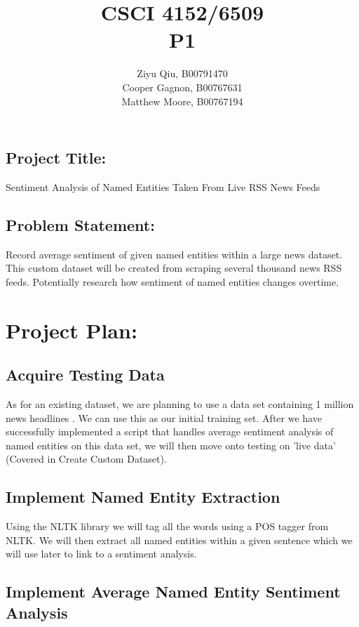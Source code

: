 \documentclass[12pt]{article}
\title{ CSCI 4152/6509  \\ P1 \\}
\author{Ziyu Qiu, B00791470 \\ Cooper Gagnon, B00767631 \\ Matthew Moore, B00767194}
\begin{document}
\maketitle

\begin{center}
\section*{Project Title:}
Sentiment Analysis of Named Entities Taken From Live RSS News Feeds
\end{center}

\begin{center}
\section*{Problem Statement:}
Record average sentiment of given named entities within a large news dataset. This custom dataset will be created from scraping several thousand news RSS feeds. Potentially research how sentiment of named entities changes overtime.
\end{center}

\newpage
\section{Project Plan:}
\subsection{Acquire Testing Data}

As for an existing dataset, we are planning to use a data set containing 1 million news headlines \cite{Kaggle}. We can use this as our initial training set. After we have successfully implemented a script that handles average sentiment analysis of named entities on this data set, we will then move onto testing on 'live data' (Covered in Create Custom Dataset).

\subsection{Implement Named Entity Extraction}

Using the NLTK library we will tag all the words using a POS tagger from NLTK. We will then extract all named entities within a given sentence which we will use later to link to a sentiment analysis.

\subsection{Implement Average Named Entity Sentiment Analysis}
\end{document}
